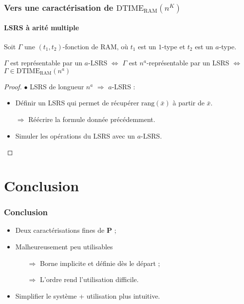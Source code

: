 \documentclass[10pt]{beamer}
\newcommand{\dtimeram}{\text{DTIME}_{\text{RAM}}\left( n^K \right)}
\newcommand{\dtimeramarg}[1]{\text{DTIME}_{\text{RAM}}\left( n^{#1} \right)}
\newcommand{\rang}[1]{\text{rang}\left( #1 \right)}
\begin{document}
	\begin{frame}
		\frametitle{Vers une caractérisation de $\dtimeram$}
		\framesubtitle{LSRS à arité multiple}
		
		\begin{thm}
			Soit $\Gamma$ une $(t_1,t_2)$-fonction de RAM, où $t_1$ est un $1$-type et $t_2$ est un $a$-type.
			
			$\Gamma$ est représentable par un $a$-LSRS $\Leftrightarrow$ $\Gamma$ est $n^a$-représentable par un LSRS $\Leftrightarrow$ $\Gamma \in \dtimeramarg{a}$
		\end{thm}
		
		\begin{proof}
			$\bullet$ LSRS de longueur $n^a$ $\Rightarrow$ $a$-LSRS :
			\begin{itemize}
				\item 	Définir un LSRS qui permet de récupérer $\rang{\bar{x}}$ à partir de $\bar{x}$.
				\item[$\Rightarrow$] Réécrire la formule donnée précédemment.
				\pause 
				\item	Simuler les opérations du LSRS avec un $a$-LSRS.
			\end{itemize}
			
		\end{proof}
	\end{frame}

	
	
	\section*{Conclusion}
	
	
	\begin{frame}
		\frametitle{Conclusion}
		
		\begin{itemize}
			\item 	Deux caractérisations fines de $\textbf{P}$ ;
			\pause
			\item 	Malheureusement peu utilisables
			\begin{itemize}
				\item[$\Rightarrow$] Borne implicite et définie dès le départ ;
				\pause 
				\item[$\Rightarrow$] L'ordre rend l'utilisation difficile.
			\end{itemize}
			
			\pause 
			\item 	Simplifier le système + utilisation plus intuitive.
		\end{itemize}
		
	\end{frame}
	
	
\end{document}
